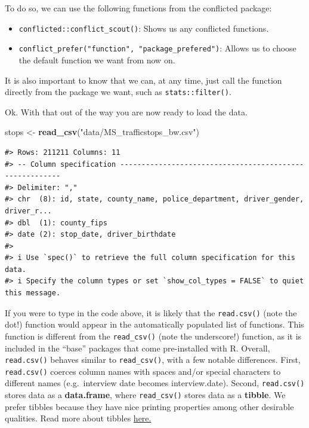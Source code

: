 \documentclass[
]{book}
\newenvironment{Shaded}{\begin{snugshade}}{\end{snugshade}}
\newcommand{\FunctionTok}[1]{\textcolor[rgb]{0.13,0.29,0.53}{\textbf{#1}}}
\newcommand{\NormalTok}[1]{#1}
\newcommand{\OtherTok}[1]{\textcolor[rgb]{0.56,0.35,0.01}{#1}}
\newcommand{\StringTok}[1]{\textcolor[rgb]{0.31,0.60,0.02}{#1}}
\providecommand{\tightlist}{%
  \setlength{\itemsep}{0pt}\setlength{\parskip}{0pt}}
\begin{document}
To do so, we can use the following functions from the conflicted package:

\begin{itemize}
\tightlist
\item
  \texttt{conflicted::conflict\_scout()}: Shows us any conflicted functions.
\item
  \texttt{conflict\_prefer("function",\ "package\_prefered")}: Allows us to choose the default function we want from now on.
\end{itemize}

It is also important to know that we can, at any time, just call the function directly from the package we want, such as \texttt{stats::filter()}.

Ok. With that out of the way you are now ready to load the data.

\begin{Shaded}
\begin{Highlighting}[]
\NormalTok{stops }\OtherTok{\textless{}{-}} \FunctionTok{read\_csv}\NormalTok{(}\StringTok{"data/MS\_trafficstops\_bw.csv"}\NormalTok{)}
\end{Highlighting}
\end{Shaded}

\begin{verbatim}
#> Rows: 211211 Columns: 11
#> -- Column specification --------------------------------------------------------
#> Delimiter: ","
#> chr  (8): id, state, county_name, police_department, driver_gender, driver_r...
#> dbl  (1): county_fips
#> date (2): stop_date, driver_birthdate
#> 
#> i Use `spec()` to retrieve the full column specification for this data.
#> i Specify the column types or set `show_col_types = FALSE` to quiet this message.
\end{verbatim}

If you were to type in the code above, it is likely that the \texttt{read.csv()} (note the dot!) function would appear in the automatically populated list of functions. This function is different from the \texttt{read\_csv()} (note the underscore!) function, as it is included in the ``base'' packages that come pre-installed with R. Overall, \texttt{read.csv()} behaves similar to \texttt{read\_csv()}, with a few notable differences. First, \texttt{read.csv()} coerces column names with spaces and/or special characters to different names (e.g.~interview date becomes interview.date). Second, \texttt{read.csv()} stores data as a \textbf{data.frame}, where \texttt{read\_csv()} stores data as a \textbf{tibble}. We prefer tibbles because they have nice printing properties among other desirable qualities. Read more about tibbles \href{https://tibble.tidyverse.org/}{here.}
\end{document}
